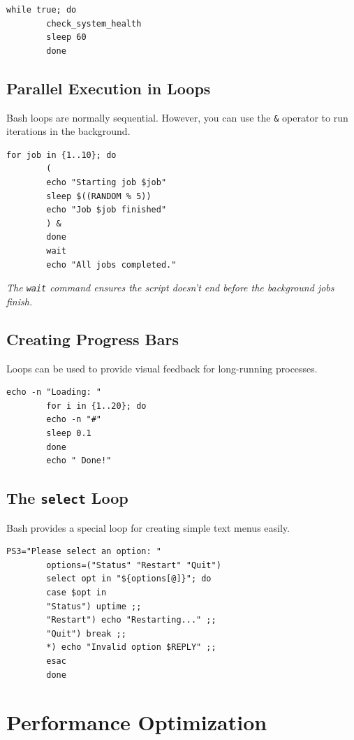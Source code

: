 \documentclass[12pt,a4paper]{article}
\begin{document}
	\begin{lstlisting}[caption=The infinite loop]
		while true; do
		check_system_health
		sleep 60
		done
	\end{lstlisting}
	
	\subsection{Parallel Execution in Loops}
	Bash loops are normally sequential. However, you can use the \texttt{\&} operator to run iterations in the background.
	
	\begin{lstlisting}[caption=Parallel background processing]
		for job in {1..10}; do
		(
		echo "Starting job $job"
		sleep $((RANDOM % 5))
		echo "Job $job finished"
		) &
		done
		wait
		echo "All jobs completed."
	\end{lstlisting}
	\textit{The \texttt{wait} command ensures the script doesn't end before the background jobs finish.}
	
	\subsection{Creating Progress Bars}
	Loops can be used to provide visual feedback for long-running processes.
	
	\begin{lstlisting}[caption=Simple progress bar]
		echo -n "Loading: "
		for i in {1..20}; do
		echo -n "#"
		sleep 0.1
		done
		echo " Done!"
	\end{lstlisting}
	
	\subsection{The \texttt{select} Loop}
	Bash provides a special loop for creating simple text menus easily.
	
	\begin{lstlisting}[caption=Interactive menu with select]
		PS3="Please select an option: "
		options=("Status" "Restart" "Quit")
		select opt in "${options[@]}"; do
		case $opt in
		"Status") uptime ;;
		"Restart") echo "Restarting..." ;;
		"Quit") break ;;
		*) echo "Invalid option $REPLY" ;;
		esac
		done
	\end{lstlisting}
	
	\newpage
	\section{Performance Optimization}
	
\end{document}
